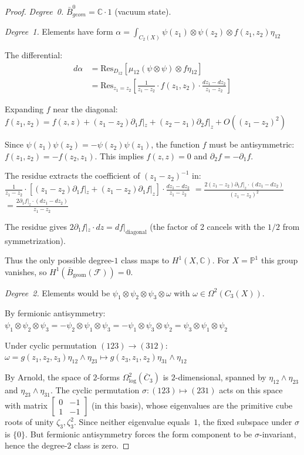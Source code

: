\begin{proof}
\emph{Degree~0.} $\bar{B}^0_{geom} = \mathbb{C} \cdot 1$ (vacuum state).

\emph{Degree~1.} Elements have form
$\alpha = \int_{C_2(X)} \psi(z_1) \otimes \psi(z_2) \otimes f(z_1,z_2)\eta_{12}$

The differential:
\begin{align}
d\alpha &= \text{Res}_{D_{12}}[\mu_{12}(\psi \otimes \psi) \otimes f\eta_{12}]\\
&= \text{Res}_{z_1=z_2}\left[\frac{1}{z_1-z_2} \cdot f(z_1,z_2) \cdot \frac{dz_1-dz_2}{z_1-z_2}\right]
\end{align}

Expanding $f$ near the diagonal:
$f(z_1, z_2) = f(z, z) + (z_1 - z_2)\partial_1 f|_z + (z_2 - z_1)\partial_2 f|_z + O((z_1 - z_2)^2)$

Since $\psi(z_1)\psi(z_2) = -\psi(z_2)\psi(z_1)$, the function $f$ must be antisymmetric: $f(z_1, z_2) = -f(z_2, z_1)$. This implies $f(z, z) = 0$ and $\partial_2 f = -\partial_1 f$.

The residue extracts the coefficient of $(z_1 - z_2)^{-1}$ in:
$\frac{1}{z_1 - z_2} \cdot [(z_1 - z_2)\partial_1 f|_z + (z_1 - z_2)\partial_1 f|_z] \cdot \frac{dz_1 - dz_2}{z_1 - z_2}$
$= \frac{2(z_1 - z_2)\partial_1 f|_z \cdot (dz_1 - dz_2)}{(z_1 - z_2)^2}$
$= \frac{2\partial_1 f|_z \cdot (dz_1 - dz_2)}{z_1 - z_2}$

The residue gives $2\partial_1 f|_z \cdot dz = df|_{\text{diagonal}}$ (the factor of 2 cancels with the $1/2$ from symmetrization).

Thus the only possible degree-$1$ class maps to
$H^1(X,\mathbb{C})$. For $X=\mathbb{P}^1$ this group vanishes, so
$H^1(\bar B_{\mathrm{geom}}(\mathcal F))=0$.

\emph{Degree~2.} Elements would be $\psi_1 \otimes \psi_2 \otimes \psi_3 \otimes \omega$ with $\omega \in \Omega^2(C_3(X))$.

By fermionic antisymmetry:
$\psi_1 \otimes \psi_2 \otimes \psi_3 = -\psi_2 \otimes \psi_1 \otimes \psi_3 = -\psi_1 \otimes \psi_3 \otimes \psi_2 = \psi_3 \otimes \psi_1 \otimes \psi_2$

Under cyclic permutation $(123) \to (312)$:
$\omega = g(z_1,z_2,z_3)\eta_{12} \wedge \eta_{23} \mapsto g(z_3,z_1,z_2)\eta_{31} \wedge \eta_{12}$

By Arnold, the space of $2$-forms $\Omega^2_{\log}(\overline{C}_3)$ is $2$-dimensional, spanned by $\eta_{12} \wedge \eta_{23}$ and $\eta_{23} \wedge \eta_{31}$. The cyclic permutation $\sigma: (123) \mapsto (231)$ acts on this space with matrix
$\left[\begin{smallmatrix} 0 & -1 \\ 1 & -1 \end{smallmatrix}\right]$
(in this basis), whose eigenvalues are the primitive cube roots of unity $\zeta_3, \zeta_3^2$. Since neither eigenvalue equals~$1$, the fixed subspace under $\sigma$ is $\{0\}$. But fermionic antisymmetry forces the form component to be $\sigma$-invariant, hence the degree-$2$ class is zero.


\end{proof}
